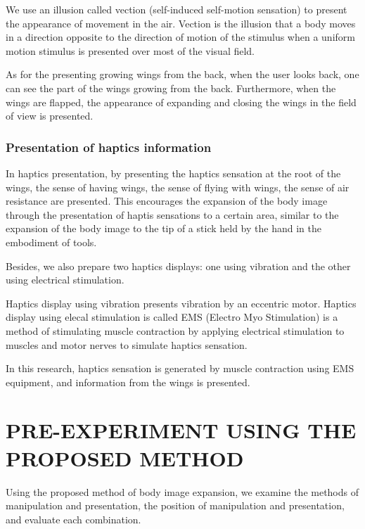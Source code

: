 \documentclass[letterpaper, 10 pt, conference]{ieeeconf}  %
\begin{document}
                        We use an illusion called vection (self-induced self-motion sensation) to present the appearance of movement in the air\cite{bhalla1999visual}.
                        Vection is the illusion that a body moves in a direction opposite to the direction of motion of the stimulus when a uniform motion stimulus is presented over most of the visual field.  
                        
                        As for the presenting growing wings from the back, when the user looks back, one can see the part of the wings growing from the back.
                        Furthermore, when the wings are flapped, the appearance of expanding and closing the wings in the field of view is presented.

                \subsubsection{Presentation of haptics information}
                        In haptics presentation, by presenting the haptics sensation at the root of the wings, the sense of having wings, the sense of flying with wings, the sense of air resistance are presented.  
                        This encourages the expansion of the body image through the presentation of haptis sensations to a certain area, similar to the expansion of the body image to the tip of a stick held by the hand in the embodiment of tools.

                        Besides, we also prepare two haptics displays: one using vibration and the other using electrical stimulation.

                        Haptics display using vibration presents vibration by an eccentric motor.  
                        Haptics display using elecal stimulation is called EMS (Electro Myo Stimulation) is a method of stimulating muscle contraction by applying electrical stimulation to muscles and motor nerves to simulate haptics sensation.  

                        In this research, haptics sensation is generated by muscle contraction using EMS equipment, and information from the wings is presented.  


\section{PRE-EXPERIMENT USING THE PROPOSED METHOD}
        Using the proposed method of body image expansion, we examine the methods of manipulation and presentation, the position of manipulation and presentation, and evaluate each combination.  
\end{document}
